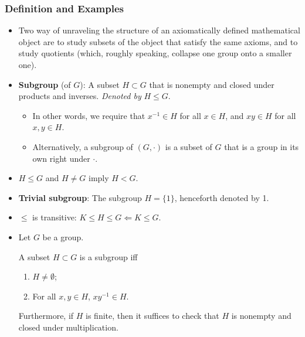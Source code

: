 \documentclass[../main.tex]{subfiles}
\begin{document}
\subsubsection{Definition and Examples}
\begin{itemize}
    \item Two way of unraveling the structure of an axiomatically defined mathematical object are to study subsets of the object that satisfy the same axioms, and to study quotients (which, roughly speaking, collapse one group onto a smaller one).
    \item \textbf{Subgroup} (of $G$): A subset $H\subset G$ that is nonempty and closed under products and inverses. \emph{Denoted by} $H\leq G$.
    \begin{itemize}
        \item In other words, we require that $x^{-1}\in H$ for all $x\in H$, and $xy\in H$ for all $x,y\in H$.
        \item Alternatively, a subgroup of $(G,\cdot)$ is a subset of $G$ that is a group in its own right under $\cdot$.
    \end{itemize}
    \item $H\leq G$ and $H\neq G$ imply $H<G$.
    \item \textbf{Trivial subgroup}: The subgroup $H=\{1\}$, henceforth denoted by 1.
    \item $\leq$ is transitive: $K\leq H\leq G\Longleftarrow K\leq G$.
    \item Let $G$ be a group.
    \begin{proposition}
        A subset $H\subset G$ is a subgroup iff
        \begin{enumerate}[label={\textup{\textbf{(\arabic*)}}}]
            \item $H\neq\emptyset$;
            \item For all $x,y\in H$, $xy^{-1}\in H$.
        \end{enumerate}
        Furthermore, if $H$ is finite, then it suffices to check that $H$ is nonempty and closed under multiplication.
    \end{proposition}
\end{itemize}
\end{document}
